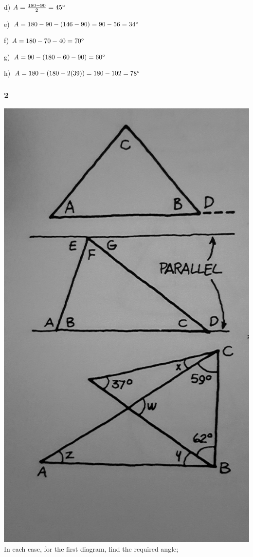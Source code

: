 \documentclass[]{report}
\begin{document}
d) $A = \frac{180 - 90}{2} = 45\degree$

e) $A = 180 - 90 - (146 - 90) = 90 -  56 = 34\degree$

f) $A = 180 - 70 - 40 = 70\degree$

g) $A = 90 - (180 - 60 - 90) = 60\degree$

h) $A = 180 - (180 - 2(39)) = 180 - 102 = 78\degree$
\subsubsection{2}

\includegraphics[width=\textwidth]{precalc-geo-section1-2.jpg}
In each case, for the first diagram, find the required angle;
\end{document}
